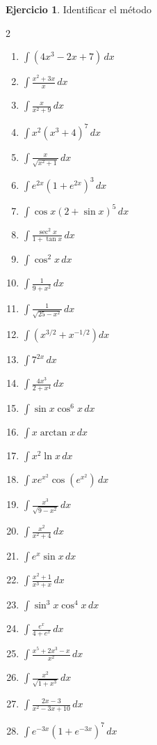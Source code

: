 \documentclass[12pt]{article}
\theoremstyle{definition}
\newtheorem{Ejer}[teorema]{Ejercicio}
\theoremstyle{remark}
\begin{document}
\begin{Ejer}{Identificar el método}
\begin{multicols}{2}
\begin{enumerate}[resume=integrales]
\item $\displaystyle \int(4x^3-2x+7)\,dx$
\item $\displaystyle \int\frac{x^2+3x}{x}\,dx$
\item $\displaystyle \int\frac{x}{x^2+9}\,dx$
\item $\displaystyle \int x^2(x^3+4)^7\,dx$
\item $\displaystyle \int\frac{x}{\sqrt{x^2+1}}\,dx$
\item $\displaystyle \int e^{2x}(1+e^{2x})^3\,dx$
\item $\displaystyle \int\cos x(2+\sin x)^5\,dx$
\item $\displaystyle \int\frac{\sec^2x}{1+\tan x}\,dx$
\item $\displaystyle \int\cos^2x\,dx$
\item $\displaystyle \int\frac{1}{9+x^2}\,dx$
\item $\displaystyle \int\frac{1}{\sqrt{25-x^2}}\,dx$
\item $\displaystyle \int\left(x^{3/2}+x^{-1/2}\right)dx$
\item $\displaystyle \int 7^{2x}\,dx$
\item $\displaystyle \int\frac{4x^3}{2+x^4}\,dx$
\item $\displaystyle \int\sin x\cos^6x\,dx$
\item $\displaystyle \int x\arctan x\,dx$
\item $\displaystyle \int x^2\ln x\,dx$
\item $\displaystyle \int x e^{x^2}\cos(e^{x^2})\,dx$
\item $\displaystyle \int \frac{x^3}{\sqrt{9-x^2}}\,dx$
\item $\displaystyle \int \frac{x^2}{x^2+4}\,dx$
\item $\displaystyle \int e^x\sin x\,dx$
\item $\displaystyle \int \frac{x^2+1}{x^3+x}\,dx$
\item $\displaystyle \int \sin^3x\cos^4x\,dx$
\item $\displaystyle \int\frac{e^x}{4+e^x}\,dx$
\item $\displaystyle \int\frac{x^5+2x^3-x}{x^2}\,dx$
\item $\displaystyle \int\frac{x^2}{\sqrt{1+x^3}}\,dx$
\item $\displaystyle \int\frac{2x-3}{x^2-3x+10}\,dx$
\item $\displaystyle \int e^{-3x}(1+e^{-3x})^7\,dx$

\end{enumerate}
\end{multicols}
\end{Ejer}
\end{document}
